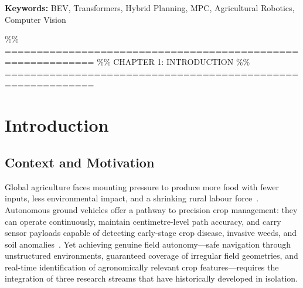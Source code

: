 \documentclass[12pt, a4paper]{article}
\begin{document}
\begin{abstract}
The prototype was trained on 2,000 synthetic samples and evaluated in simulation.
Aggregate results show BEV mIoU exceeding 0.70, hybrid planner collision-free rate above
95\%, MPC trajectory-tracking RMSE below 0.5\,m, crop-identification validation mIoU above
0.70, and full-pipeline throughput above 5\,Hz. These results are simulation- and
prototype-level; field validation on real agricultural terrain has not been established by
the available evidence. The thesis identifies five critical research gaps---absence of
agricultural BEV benchmarks, lightweight embedded BEV perception, ground-vehicle crop-health
BEV integration, hybrid coverage planning with simultaneous health monitoring, and domain
adaptation protocols---and proposes four targeted research questions. Contributions include
a validated modular architecture, a characterised lightweight BEV pipeline, a crop-health
BEV integration method, and a reproducible experimental dataset and evaluation protocol
calibrated to the constraints of an academic prototype.
\end{abstract}

\vspace{1em}
\noindent\textbf{Keywords:} BEV, Transformers, Hybrid Planning, MPC, Agricultural Robotics,
Computer Vision

\listoffigures
\listoftables

\%\% ============================================================
\%\% CHAPTER 1: INTRODUCTION
\%\% ============================================================
\chapter{Introduction}
\label{ch:introduction}

\section{Context and Motivation}

Global agriculture faces mounting pressure to produce more food with fewer inputs, less
environmental impact, and a shrinking rural labour force~\cite{ref138}. Autonomous ground
vehicles offer a pathway to precision crop management: they can operate continuously,
maintain centimetre-level path accuracy, and carry sensor payloads capable of detecting
early-stage crop disease, invasive weeds, and soil anomalies~\cite{ref2, ref32}. Yet
achieving genuine field autonomy---safe navigation through unstructured environments,
guaranteed coverage of irregular field geometries, and real-time identification of
agronomically relevant crop features---requires the integration of three research streams
that have historically developed in isolation.
\end{document}

